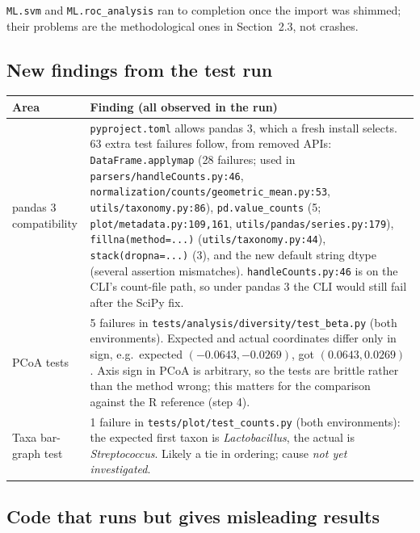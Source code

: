 \documentclass[11pt,a4paper]{article}
\newcommand{\code}[1]{\texttt{\small #1}}
\begin{document}
\noindent\code{ML.svm} and \code{ML.roc\_analysis} ran to completion once the import was shimmed; their problems are the
methodological ones in Section~2.3, not crashes.

\subsection{New findings from the test run}

\begin{longtable}{@{}P{2.8cm}P{12.5cm}@{}}
\toprule
\textbf{Area} & \textbf{Finding (all observed in the run)}\\
\midrule
\endhead
pandas 3 compatibility & \code{pyproject.toml} allows pandas 3, which a fresh install selects. 63 extra test failures follow, from
removed APIs: \code{DataFrame.applymap} (28 failures; used in \code{parsers/handleCounts.py:46},
\code{normalization/counts/geometric\_mean.py:53}, \code{utils/taxonomy.py:86}), \code{pd.value\_counts} (5;
\code{plot/metadata.py:109,161}, \code{utils/pandas/series.py:179}), \code{fillna(method=...)} (\code{utils/taxonomy.py:44}),
\code{stack(dropna=...)} (3), and the new default string dtype (several assertion mismatches).
\code{handleCounts.py:46} is on the CLI's count-file path, so under pandas 3 the CLI would still fail after the SciPy fix.\\
PCoA tests & 5 failures in \code{tests/analysis/diversity/test\_beta.py} (both environments). Expected and actual coordinates
differ only in sign, e.g.\ expected $(-0.0643, -0.0269)$, got $(0.0643, 0.0269)$. Axis sign in PCoA is arbitrary, so the
tests are brittle rather than the method wrong; this matters for the comparison against the R reference (step 4).\\
Taxa bar-graph test & 1 failure in \code{tests/plot/test\_counts.py} (both environments): the expected first taxon is
\textit{Lactobacillus}, the actual is \textit{Streptococcus}. Likely a tie in ordering; cause \emph{not yet investigated}.\\
\bottomrule
\end{longtable}

\subsection{Code that runs but gives misleading results}
\end{document}
